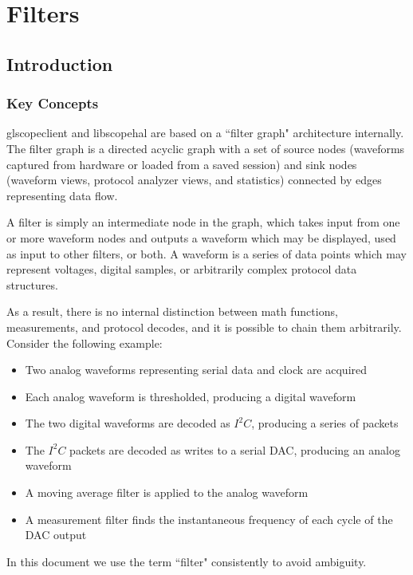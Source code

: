 \section{Filters}

\subsection{Introduction}

\subsubsection{Key Concepts}

glscopeclient and libscopehal are based on a ``filter graph" architecture internally. The filter graph is a directed
acyclic graph with a set of source nodes (waveforms captured from hardware or loaded from a saved session) and sink
nodes (waveform views, protocol analyzer views, and statistics) connected by edges representing data flow.

A filter is simply an intermediate node in the graph, which takes input from one or more waveform nodes and outputs a
waveform which may be displayed, used as input to other filters, or both. A waveform is a series of data points which
may represent voltages, digital samples, or arbitrarily complex protocol data structures.

As a result, there is no internal distinction between math functions, measurements, and protocol decodes, and it is
possible to chain them arbitrarily. Consider the following example:

\begin{itemize}
\item Two analog waveforms representing serial data and clock are acquired
\item Each analog waveform is thresholded, producing a digital waveform
\item The two digital waveforms are decoded as $I^2C$, producing a series of packets
\item The $I^2C$ packets are decoded as writes to a serial DAC, producing an analog waveform
\item A moving average filter is applied to the analog waveform
\item A measurement filter finds the instantaneous frequency of each cycle of the DAC output
\end{itemize}

In this document we use the term ``filter" consistently to avoid ambiguity.

